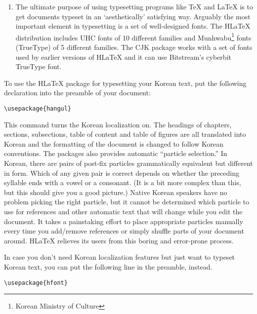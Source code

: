 \begin{enumerate}
The CJK package is not specific to Korean. It can
process input files in UTF-8 as well as in various CJK encodings
including EUC-KR and CP949/Windows-949/UHC, it can be used to typeset documents with
multilingual content (especially Chinese, Japanese and Korean).
The CJK package has no Korean localization such as the one offered by H\LaTeX{} and it
does not come with as many special Korean fonts as H\LaTeX.

\item The ultimate purpose of using typesetting programs like \TeX{}
and \LaTeX{} is to get documents typeset in an `aesthetically' satisfying way.
Arguably the most important element in typesetting is  a set of
well-designed fonts. The H\LaTeX{} distribution
includes UHC \PSi{} fonts 
of 10
different families and
Munhwabu\footnote{Korean Ministry of Culture}
fonts (TrueType) of 5 different families.
The CJK package works with a set of fonts used by earlier versions
of H\LaTeX{} and it can use Bitstream's cyberbit TrueType
font.
\end{enumerate}

To use the  H\LaTeX{} package for typesetting your Korean text, put the following
declaration into the preamble of your document:
\begin{lscommand}
\verb+\usepackage{hangul}+
\end{lscommand}

This command turns the Korean localization on. The headings
of chapters, sections, subsections, table of content and table of
figures are all translated into Korean and the formatting of the document
is changed to follow Korean conventions. 
The packages also provides automatic ``particle selection.''
In Korean, there are pairs of post-fix particles 
grammatically equivalent but different in form. Which 
of any given pair is correct depends on 
whether the preceding syllable ends with a  vowel or a consonant.
(It is a bit more complex than this, but this should give you
a good picture.)
Native Korean speakers have no problem picking the right particle, but
it cannot be determined which particle to use for references and other automatic
text that will change while you edit the document.
It 
takes a painstaking effort to place appropriate particles manually
every time you add/remove references or simply shuffle  parts
of your document around.
H\LaTeX{} relieves its users from this boring and error-prone process.

In case you don't need Korean localization features
but just want 
to  typeset Korean text, you can put the following line in the 
preamble, instead.
\begin{lscommand}
\verb+\usepackage{hfont}+
\end{lscommand}


